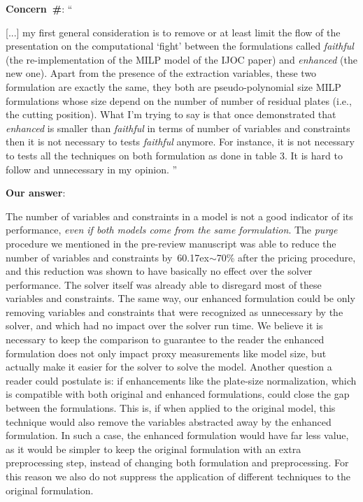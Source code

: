 \documentclass[smallextended]{svjour3}       %
\makeatletter
\newcommand{\mytilde}{\raise.17ex\hbox{$\scriptstyle\mathtt{\sim}$}}
\newcommand\gobblepars{%
    \@ifnextchar\par%
        {\expandafter\gobblepars\@gobble}%
        {}}
\newcounter{concern}
\newenvironment{concern}{%
    \refstepcounter{concern}\par\smallskip\noindent%
    \textbf{Concern~\#\theconcern}: ``\itshape\gobblepars}%
    {\unskip''\smallskip}
\newcounter{answer}
\newenvironment{answer}{%
    \refstepcounter{answer}\par\smallskip\noindent%
    \textbf{Our answer}: \gobblepars}%
    {\unskip\bigskip}
\makeatother
\begin{document}
\begin{concern}
[...] my first general consideration is to remove or at least limit the flow of the presentation on the computational `fight' between the formulations called \emph{faithful} (the re-implementation of the MILP model of the IJOC paper) and \emph{enhanced} (the new one). Apart from the presence of the extraction variables, these two formulation are exactly the same, they both are pseudo-polynomial size MILP formulations whose size depend on the number of number of residual plates (i.e., the cutting position). What I’m trying to say is that once demonstrated that \emph{enhanced} is smaller than \emph{faithful} in terms of number of variables and constraints then it is not necessary to tests \emph{faithful} anymore. For instance, it is not necessary to tests all the techniques on both formulation as done in table 3. It is hard to follow and unnecessary in my opinion.
\end{concern}
\begin{answer}
The number of variables and constraints in a model is not a good indicator of its performance, \emph{even if both models come from the same formulation}.
The \emph{purge} procedure we mentioned in the pre-review manuscript was able to reduce the number of variables and constraints by~60\mytilde70\% after the pricing procedure, and this reduction was shown to have basically no effect over the solver performance.
The solver itself was already able to disregard most of these variables and constraints.
The same way, our enhanced formulation could be only removing variables and constraints that were recognized as unnecessary by the solver, and which had no impact over the solver run time.
We believe it is necessary to keep the comparison to guarantee to the reader the enhanced formulation does not only impact proxy measurements like model size, but actually make it easier for the solver to solve the model.
Another question a reader could postulate is: if enhancements like the plate-size normalization, which is compatible with both original and enhanced formulations, could close the gap between the formulations.
This is, if when applied to the original model, this technique would also remove the variables abstracted away by the enhanced formulation.
In such a case, the enhanced formulation would have far less value, as it would be simpler to keep the original formulation with an extra preprocessing step, instead of changing both formulation and preprocessing.
For this reason we also do not suppress the application of different techniques to the original formulation.
\end{answer}
\end{document}
